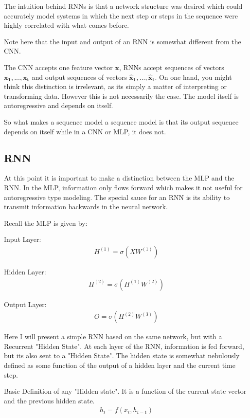 \documentclass{article}
\begin{document}
The intuition behind RNNs is that a network structure was desired which could accurately model systems in which the next step or steps in the sequence were highly correlated with what comes before.

Note here that the input and output of an RNN is somewhat different from the CNN.

The CNN accepts one feature vector $\mathbf{x}$, RNNs accept sequences of vectors $\mathbf{x_1},...,\mathbf{x_t}$ and output sequences of vectors $\mathbf{\hat{x}_1},...,\mathbf{\hat{x}_t}$. On one hand, you might think this distinction is irrelevant, as its simply a matter of interpreting or transforming data. However this is not necessarily the case. The model itself is autoregressive and depends on itself.

So what makes a sequence model a sequence model is that its output sequence depends on itself while in a CNN or MLP, it does not.

\subsection{RNN}

At this point it is important to make a distinction between the MLP and the RNN. In the MLP, information only flows forward which makes it not useful for autoregressive type modeling. The special sauce for an RNN is its ability to transmit information backwards in the neural network.


Recall the MLP is given by:

Input Layer:
\begin{align*}
H^{(1)} = \sigma(XW^{(1)}) 
\end{align*}

Hidden Layer:
\begin{align*}
H^{(2)} = \sigma(H^{(1)}W^{(2)})
\end{align*}

Output Layer:
\begin{align*}
O = \sigma(H^{(2)}W^{(3)}) 
\end{align*}


Here I will present a simple RNN based on the same network, but with a Recurrent "Hidden State". At each layer of the RNN, information is fed forward, but its also sent to a "Hidden State". The hidden state is somewhat nebulously defined as some function of the output of a hidden layer and the current time step.

Basic Definition of any "Hidden state". It is a function of the current state vector and the previous hidden state.
\begin{align*}
h_{t} = f(x_t, h_{t-1})
\end{align*}
\end{document}
